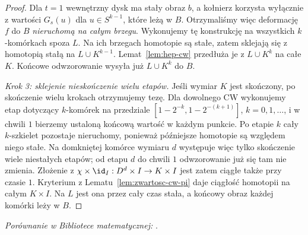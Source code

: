 \begin{proof}
Dla $t=1$ wewnętrzny dysk ma stały obraz $b$,
a kołnierz korzysta wyłącznie z wartości $G_s(u)$ dla $u\in S^{k-1}$,
które leżą w $B$. Otrzymaliśmy więc deformację $f$ do $B$
\emph{nieruchomą na całym brzegu}.
Wykonujemy tę konstrukcję na wszystkich $k$-komórkach spoza $L$.
Na ich brzegach homotopie są stałe, zatem sklejają się
z homotopią stałą na $L\cup K^{k-1}$.
Lemat~\ref{lem:hep-cw} przedłuża je z $L\cup K^k$ na całe $K$.
Końcowe odwzorowanie wysyła już $L\cup K^k$ do $B$.

\emph{Krok 3: sklejenie nieskończenie wielu etapów.}
Jeśli wymiar $K$ jest skończony, po skończenie wielu krokach
otrzymujemy tezę. Dla dowolnego CW wykonujemy etap dotyczący
$k$-komórek na przedziale
$[1-2^{-k},1-2^{-(k+1)}]$, $k=0,1,\ldots$,
i w chwili $1$ bierzemy ustaloną końcową wartość w każdym punkcie.
Po etapie $k$ cały $k$-szkielet pozostaje nieruchomy,
ponieważ późniejsze homotopie są względem niego stałe.
Na domkniętej komórce wymiaru $d$ występuje więc tylko
skończenie wiele niestałych etapów; od etapu $d$ do chwili $1$
odwzorowanie już się tam nie zmienia.
Złożenie z $\chi\times\id_I:D^d\times I\to K\times I$
jest zatem ciągłe także przy czasie $1$.
Kryterium z Lematu~\ref{lem:zwartosc-cw-pi} daje ciągłość
homotopii na całym $K\times I$. Na $L$ jest ona przez cały czas
stała, a końcowy obraz każdej komórki leży w $B$.
\end{proof}

\noindent\emph{Porównanie w Bibliotece matematycznej:} .

